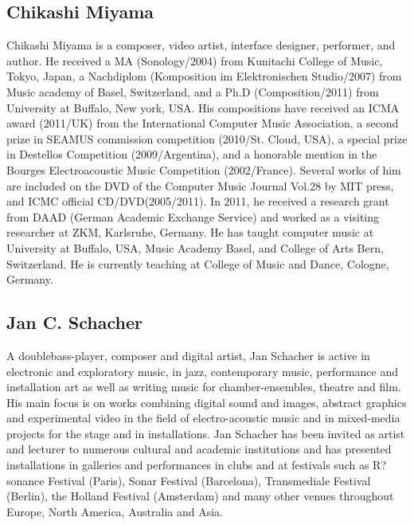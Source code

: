 \documentclass{article}
\begin{document}
\subsection*{Chikashi Miyama}
Chikashi Miyama is a composer, video artist, interface designer, performer, and author. He received a MA (Sonology/2004) from Kunitachi College of Music, Tokyo, Japan, a Nachdiplom (Komposition im Elektronischen Studio/2007) from Music academy of Basel, Switzerland, and a Ph.D (Composition/2011) from University at Buffalo, New york, USA. His compositions have received an ICMA award (2011/UK) from the International Computer Music Association, a second prize in SEAMUS commission competition (2010/St. Cloud, USA), a special prize in Destellos Competition (2009/Argentina), and a honorable mention in the Bourges Electroacoustic Music Competition (2002/France). Several works of him are included on the DVD of the Computer Music Journal Vol.28 by MIT press, and ICMC official CD/DVD(2005/2011). In 2011, he received a research grant from DAAD (German Academic Exchange Service) and worked as a visiting researcher at ZKM, Karlsruhe, Germany. He has taught computer music at  University at Buffalo, USA,  Music Academy Basel, and College of Arts Bern, Switzerland. He is currently teaching at College of Music and Dance, Cologne, Germany. 

\subsection*{Jan C. Schacher}
A doublebass-player, composer and digital artist, Jan Schacher is active in electronic and exploratory music, in jazz, contemporary music, performance and installation art as well as writing music for chamber-ensembles, theatre and film. His main focus is on works combining digital sound and images, abstract graphics and experimental video in the field of electro-acoustic music and in mixed-media projects for the stage and in installations. Jan Schacher has been invited as artist and lecturer to numerous cultural and academic institutions and has presented installations in galleries and performances in clubs and at festivals such as R?sonance Festival (Paris), Sonar Festival (Barcelona), Transmediale Festival (Berlin), the Holland Festival (Amsterdam) and many other venues throughout Europe, North America, Australia and Asia.
\end{document}
